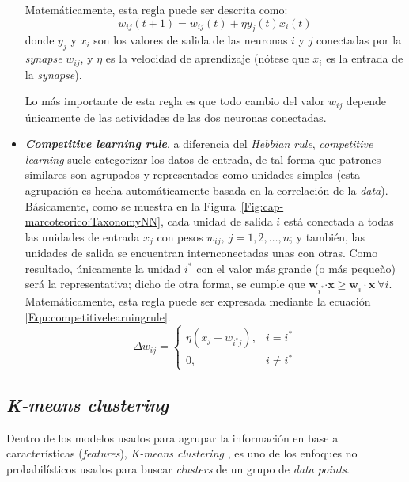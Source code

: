 \begin{itemize}
  Matemáticamente, esta regla puede ser descrita como:
  \begin{equation}
  w_{ij} (t + 1) = w_{ij}(t) + \eta y_j(t)x_i(t)
  \end{equation}
  donde $y_j$ y $x_i$ son los valores de salida de las neuronas $i$ y $j$ 
  conectadas por la \textit{synapse} $w_{ij}$, y $\eta$ es la velocidad de 
  aprendizaje (nótese que $x_i$ es la entrada de la \textit{synapse}).
  
  Lo más importante de esta regla es que todo cambio del valor $w_{ij}$ 
  depende únicamente de las actividades de las dos neuronas conectadas.
  \item \textbf{\textit{Competitive learning rule}}, a diferencia del 
  \textit{Hebbian rule}, \textit{competitive learning} suele categorizar los 
  datos de entrada, de tal forma que patrones similares son agrupados y 
  representados como unidades simples (esta agrupación es hecha 
  automáticamente basada en la correlación de la \textit{data}). Básicamente,
  como se muestra en la Figura~\ref{Fig:cap-marcoteorico:TaxonomyNN}, cada 
  unidad de salida $i$ está conectada a todas las unidades de entrada $x_j$ 
  con pesos $w_{ij}, ~j=1,2,\dots,n$; y también, las unidades de salida se 
  encuentran internconectadas unas con otras. Como resultado, únicamente la 
  unidad $i^*$ con el valor más grande (o más pequeño) será la representativa;
  dicho de otra forma, se cumple que 
  $\mathbf{ w}_{i^*} \mathbf{\cdot x \geq w}_i \cdot \mathbf{x}~ \forall i$. 
  Matemáticamente, esta regla puede ser expresada mediante la ecuación 
  \ref{Equ:competitivelearningrule}.
\begin{equation}
  \Delta w_{ij} = \left \{
    \begin{array}{rcl}
      \eta (x_j - w_{i^*j}), & i = i^* \\
      0, & i \neq i^*
    \end{array}
    \right .
  \label{Equ:competitivelearningrule}
\end{equation}
\end{itemize}

\subsection{\textit{K-means clustering}}
Dentro de los modelos usados para agrupar la información en base a 
características (\textit{features}), \textit{K-means clustering}
\cite{Bishop:2006:PRandML}, es uno de los enfoques no probabilísticos
usados para buscar \textit{clusters} de un grupo de \textit{data points}.

